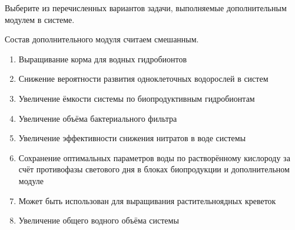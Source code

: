 
Выберите из перечисленных вариантов задачи, выполняемые дополнительным модулем в системе.

Состав дополнительного модуля считаем смешанным.

\begin{enumerate}
    \item Выращивание корма для водных гидробионтов
    \item Снижение вероятности развития одноклеточных водорослей в систем
    \item Увеличение ёмкости системы по биопродуктивным гидробионтам
    \item Увеличение объёма бактериального фильтра
    \item Увеличение эффективности снижения нитратов в воде системы
    \item Сохранение оптимальных параметров воды по растворённому кислороду за счёт противофазы светового дня в блоках биопродукции и дополнительном модуле
    \item Может быть использован для выращивания растительноядных креветок
    \item Увеличение общего водного объёма системы
\end{enumerate}